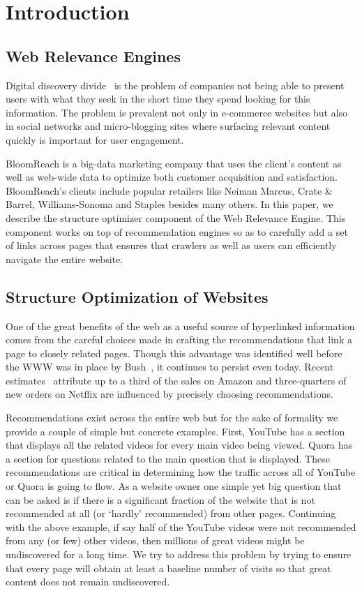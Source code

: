 \section{Introduction}

\subsection{Web Relevance Engines}
Digital discovery divide~\cite{WebRelevanceEngine} is the problem of companies not being able to present users with what they seek in the short time they spend looking for this information.
The problem is prevalent not only in e-commerce websites but also in social networks and micro-blogging sites where surfacing relevant content quickly is important for user engagement.

BloomReach is a big-data marketing company that uses the client's content as well as web-wide data to optimize both customer acquisition and satisfaction.
BloomReach's clients include popular retailers like Neiman Marcus, Crate \& Barrel, Williams-Sonoma and Staples besides many others. In this paper, we describe the structure optimizer component of the Web Relevance Engine.
This component works on top of recommendation engines so as to carefully add a set of links across pages that ensures that crawlers as well as users can efficiently navigate the entire website. 

\subsection{Structure Optimization of Websites}

One of the great benefits of the web as a useful source of hyperlinked
information comes from the careful choices made in crafting the
recommendations that link a page to closely related pages. Though this
advantage was identified well before the WWW was in place by
Bush~\cite{Bush45aswe}, it continues to persist even today.
Recent estimates~\cite{big-data-book13} attribute up to a third of the sales
on Amazon and three-quarters of new orders on Netflix are influenced by precisely choosing recommendations.

Recommendations exist across the entire web but for the sake of formality we provide a couple of simple but concrete examples. First, YouTube has a section that displays all the related videos for every main video being viewed. 
Quora has a section for questions related to the main question that is displayed. These recommendations are critical in determining how the traffic across all of YouTube or Quora is going to flow.
As a website owner one simple yet big question that can be asked is if there is a significant fraction of the website that is not recommended at all (or `hardly' recommended) from other pages. Continuing
with the above example, if say half of the YouTube videos were not recommended from any (or few) other videos, then millions of great videos might be undiscovered for a long time. We try to address this
problem by trying to ensure that every page will obtain at least a baseline number of visits so that great content does not remain undiscovered. 

